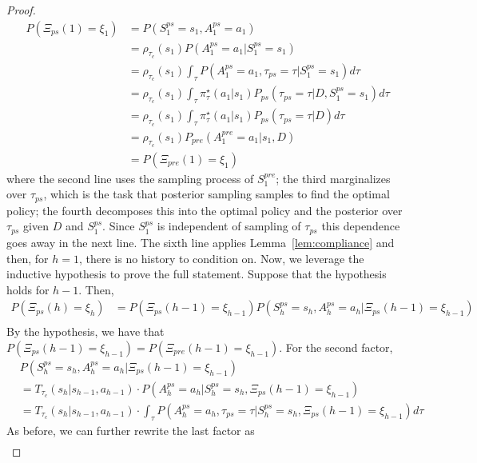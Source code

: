 \documentclass{article}
\newcommand{\pistar}{\pi^{\star}}
\begin{document}
\begin{proof}
\begin{align}
    P(\Xi_{ps}(1) = \xi_1) &  = P(S^{ps}_1  = s_1, A^{ps}_1 = a_1) \\
    & = \rho_{\tau_c}(s_1) P(A^{ps}_1 = a_1 | S^{ps}_1 = s_1) \\
    & = \rho_{\tau_c}(s_1) \int_{\tau} P(A^{ps}_1 = a_1, \tau_{ps} = \tau | S^{ps}_1 = s_1) d\tau \\
    & = \rho_{\tau_c}(s_1) \int_{\tau} \pistar_\tau(a_1 | s_1)  P_{ps} (\tau_{ps} = \tau | D, S^{ps}_1 = s_1) d\tau \\
    & = \rho_{\tau_c}(s_1) \int_{\tau} \pistar_\tau(a_1 | s_1)  P_{ps} (\tau_{ps} = \tau | D) d\tau \\
    & = \rho_{\tau_c}(s_1) P_{pre}( A^{pre}_1 = a_1 | s_1, D) \\
    & = P(\Xi_{pre}(1) = \xi_1)
\end{align}
where the second line uses the sampling process of $S^{pre}_1$; the third marginalizes over $\tau_{ps}$, which is the task that posterior sampling samples to find the optimal policy; the fourth decomposes this into the optimal policy and the posterior over $\tau_{ps}$ given $D$ and $S^{ps}_1$. Since $S^{ps}_1$ is independent of sampling of $\tau_{ps}$ this dependence goes away in the next line. The sixth line applies Lemma~\ref{lem:compliance} and then, for $h = 1$, there is no history to condition on.
Now, we leverage the inductive hypothesis to prove the full statement. Suppose that the hypothesis holds for $h - 1$. Then,
\begin{align}
    P(\Xi_{ps}(h) = \xi_h) & = P(\Xi_{ps}(h - 1) = \xi_{h - 1})  P(S^{ps}_{h} = s_h, A^{ps}_h = a_h | \Xi_{ps}(h - 1) = \xi_{h - 1}) \\
\end{align}
By the hypothesis, we have that $P(\Xi_{ps}(h - 1) = \xi_{h - 1}) = P(\Xi_{pre}(h - 1) = \xi_{h - 1}) $.  For the second factor,
\begin{align}
     & P(S^{ps}_{h} = s_h, A^{ps}_h = a_h | \Xi_{ps}(h - 1) = \xi_{h - 1}) \\
     & = T_{\tau_c} ( s_h | s_{h - 1},  a_{h - 1})  \cdot P(A_h^{ps} = a_h | S^{ps}_h = s_h, \Xi_{ps}(h - 1) = \xi_{h - 1})\\
      & = T_{\tau_c} (s_h |  s_{h - 1}, a_{h - 1}) \cdot  \int_{\tau} P(A_h^{ps} = a_h, \tau_{ps} = \tau | S^{ps}_h = s_h, \Xi_{ps}(h - 1) = \xi_{h - 1}) d\tau
\end{align}
As before, we can further rewrite the last factor as
\begin{align}

\end{align}
\end{proof}
\end{document}
